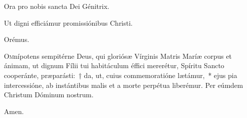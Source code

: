 \noindent \vv Ora pro nobis sancta Dei Génitrix.

\noindent \rr Ut digni efficiámur promissiónibus Christi.

Orémus.

\lettrine{O}{m}nípotens sempitérne Deus, qui gloriósæ Vírginis Matris Maríæ corpus et ánimam, ut dignum Fílii tui habitáculum éffici mererétur, Spíritu Sancto cooperánte, præparásti:~† da, ut, cuius commemoratióne lætámur,~* ejus pia intercessióne, ab instántibus malis et a morte perpétua liberémur. Per eúmdem Christum Dóminum nostrum.

 \rr Amen.